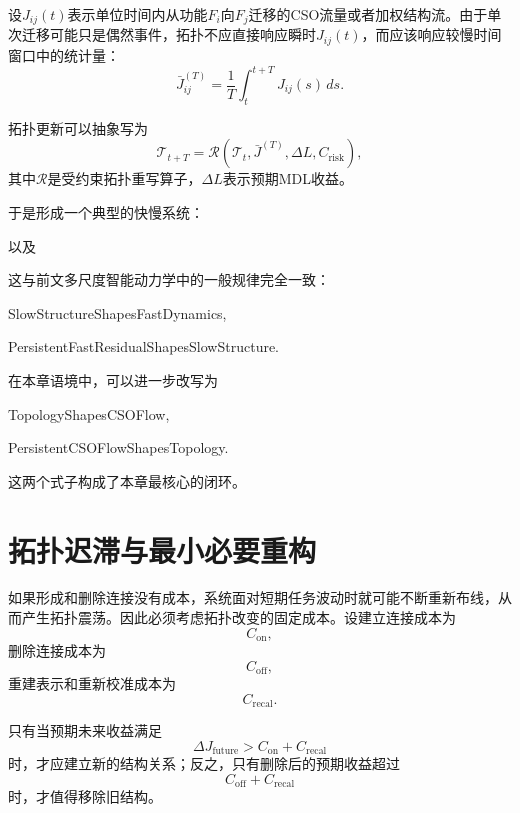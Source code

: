 设$J_{ij}(t)$表示单位时间内从功能$F_i$向$F_j$迁移的CSO流量或者加权结构流。由于单次迁移可能只是偶然事件，拓扑不应直接响应瞬时$J_{ij}(t)$，而应该响应较慢时间窗口中的统计量：
\[
\boxed{
\bar J_{ij}^{(T)}
=
\frac{1}{T}
\int_t^{t+T}
J_{ij}(s)\,ds.
}
\]

拓扑更新可以抽象写为
\[
\boxed{
\mathcal{T}_{t+T}
=
\mathcal{R}
\left(
\mathcal{T}_t,
\bar J^{(T)},
\Delta L,
C_{\mathrm{risk}}
\right),
}
\]
其中$\mathcal{R}$是受约束拓扑重写算子，$\Delta L$表示预期MDL收益。

于是形成一个典型的快慢系统：
\begin{statementbox}
\centering
{}
\end{statementbox}
以及
\begin{statementbox}
\centering
{}
\end{statementbox}

这与前文多尺度智能动力学中的一般规律完全一致：
\begin{statementbox}
SlowStructureShapesFastDynamics,
\end{statementbox}
\begin{statementbox}
PersistentFastResidualShapesSlowStructure.
\end{statementbox}

在本章语境中，可以进一步改写为
\begin{statementbox}
TopologyShapesCSOFlow,
\end{statementbox}
\begin{statementbox}
PersistentCSOFlowShapesTopology.
\end{statementbox}

这两个式子构成了本章最核心的闭环。

\section{拓扑迟滞与最小必要重构}

如果形成和删除连接没有成本，系统面对短期任务波动时就可能不断重新布线，从而产生拓扑震荡。因此必须考虑拓扑改变的固定成本。设建立连接成本为
\[
C_{\mathrm{on}},
\]
删除连接成本为
\[
C_{\mathrm{off}},
\]
重建表示和重新校准成本为
\[
C_{\mathrm{recal}}.
\]

只有当预期未来收益满足
\[
\Delta J_{\mathrm{future}}
>
C_{\mathrm{on}}
+
C_{\mathrm{recal}}
\]
时，才应建立新的结构关系；反之，只有删除后的预期收益超过
\[
C_{\mathrm{off}}
+
C_{\mathrm{recal}}
\]
时，才值得移除旧结构。

